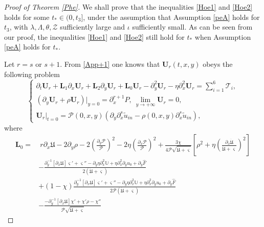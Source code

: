 \documentclass[10pt,a4paper]{amsart}
\begin{document}
\begin{proof}[Proof of Theorem \ref{Phe}]

We shall prove that the inequalities \eqref{Hoe1} and \eqref{Hoe2} holds for some $t_{*}\in (0,t_{3}]$, under the assumption that Assumption \ref{peA} holds for $t_{3}$, with $\lambda,\Lambda, \theta, \mathcal{Z}$ sufficiently large and $\iota$ sufficiently small. As can be seen from our proof, the inequalities \eqref{Hoe1} and \eqref{Hoe2} still hold for $t_{*}$ when Assumption \ref{peA} holds for $t_{*}$.

Let $r=s$ or $s+1$. From \eqref{App+1} one knows that $\mathbf{U}_{r}(t,x,y)$ obeys the following problem
\begin{equation}\label{Un}
\begin{cases}
\partial_{t}\mathbf{U}_{r}
+\mathbf{L}_{1}\partial_{x}\mathbf{U}_{r}
+\mathbf{L}_{2}\partial_{y}\mathbf{U}_{r}
+\mathbf{L}_{0}\mathbf{U}_{r}
-\partial_{y}^{2}\mathbf{U}_{r}
-\eta\partial_{x}^{2}\mathbf{U}_{r}
=\sum\limits_{i=1}^{6}\mathcal{T}_{i},\\
\left(\partial_{y}\mathbf{U}_{r}+\rho\mathbf{U}_{r}\right)|_{y=0}=\partial_{x}^{r+1}P,~
\lim\limits_{y\to+\infty} \mathbf{U}_{r}=0,\\
\mathbf{U}_{r}|_{t=0}=\mathcal{P}(0,x,y)(\partial_{y}\partial_{x}^{s}\tilde{u}_{in}-\rho(0,x,y)\partial_{x}^{s}\tilde{u}_{in}),
\end{cases}
\end{equation}
where
\begin{align*}
\mathbf{L}_{0}
=&~r\partial_{x}\mathfrak{U}-2\partial_{y}\rho
  -2\left(\frac{\partial_{y}\mathcal{P}}{\mathcal{P}}\right)^{2}-2\eta\left(\frac{\partial_{x}\mathcal{P}}{\mathcal{P}}\right)^{2}
  +\frac{3\chi}{4\mathcal{P}\sqrt{\dot{\mathfrak{U}}+\varsigma}}\left[\rho^{2}+\eta\left(\frac{\partial_{x}\dot{\mathfrak{U}}}{\dot{\mathfrak{U}}+\varsigma}\right)^{2}\right]\\
 &-\frac{\partial_{y}^{-1}\left[\partial_{x}\mathfrak{U}\right]\varsigma'+\varsigma''-\partial_{y}\eta\partial_{x}^{2}\mathbb{U}+\eta\partial_{x}^{2}\partial_{y}u_{0}+\partial_{y}\hat{F}}{2(\dot{\mathfrak{U}}+\varsigma)}\\
 &+(1-\chi)\frac{\partial_{y}^{-1}\left[\partial_{x}\mathfrak{U}\right]\varsigma'+\varsigma''-\partial_{y}\eta\partial_{x}^{2}\mathbb{U}+\eta\partial_{x}^{2}\partial_{y}u_{0}+\partial_{y}\hat{F}}{2\mathcal{P}(\dot{\mathfrak{U}}+\varsigma)}\\
 &-\frac{-\partial_{y}^{-1}[\partial_{x}\mathfrak{U}]\chi'+\chi'\rho-\chi''}{\mathcal{P}\sqrt{\dot{\mathfrak{U}}+\varsigma}}

\end{align*}
\end{proof}
\end{document}
